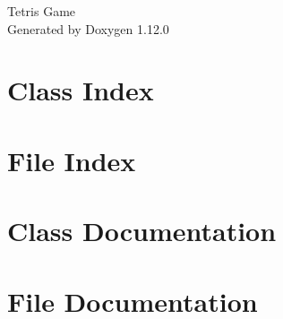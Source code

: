 \documentclass[twoside]{book}
\newcommand{\+}{\discretionary{\mbox{\scriptsize$\hookleftarrow$}}{}{}}
\newcommand{\clearemptydoublepage}{%
    \newpage{\pagestyle{empty}\cleardoublepage}%
  }
\begin{document}
  \raggedbottom
    \hypersetup{pageanchor=false,
                bookmarksnumbered=true,
                pdfencoding=unicode
               }
  \begin{titlepage}
  \vspace*{7cm}
  \begin{center}%
  {\Large Tetris Game}\\
  \vspace*{1cm}
  {\large Generated by Doxygen 1.12.0}\\
  \end{center}
  \end{titlepage}
  \clearemptydoublepage
  \tableofcontents
  \clearemptydoublepage
  \hypersetup{pageanchor=true}

\chapter{Class Index}

\chapter{File Index}

\chapter{Class Documentation}





\chapter{File Documentation}


  \backmatter
  \newpage
  \clearemptydoublepage
  \printindex
\end{document}
